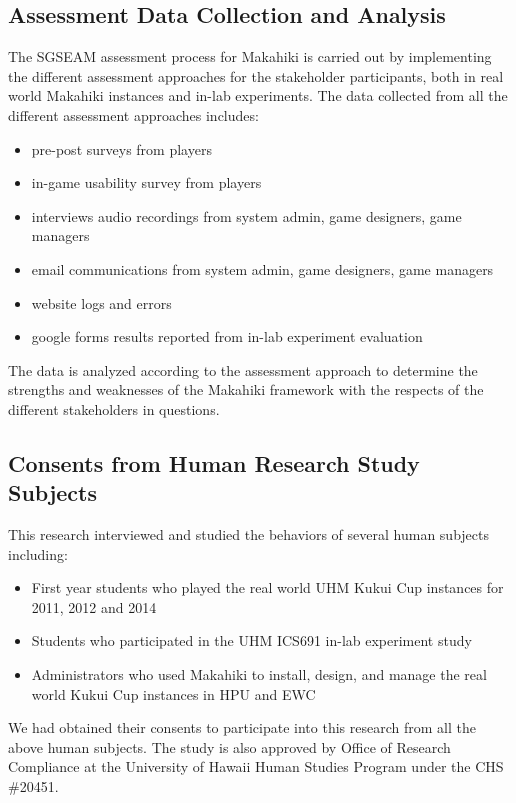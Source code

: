 \subsection{Assessment Data Collection and Analysis}

The SGSEAM assessment process for Makahiki is carried out by implementing the different assessment approaches for the stakeholder participants, both in real world Makahiki instances and in-lab experiments. The data collected from all the different assessment approaches includes:

\begin{itemize}
\item pre-post surveys from players
\item in-game usability survey from players
\item interviews audio recordings from system admin, game designers, game managers
\item email communications from system admin, game designers, game managers
\item website logs and errors
\item google forms results reported from in-lab experiment evaluation
\end{itemize}

The data is analyzed according to the assessment approach to determine the strengths and weaknesses of the Makahiki framework with the respects of the different stakeholders in questions.

\subsection{Consents from Human Research Study Subjects}
This research interviewed and studied the behaviors of several human subjects including:

\begin{itemize}
\item First year students who played the real world UHM Kukui Cup instances for 2011, 2012 and 2014
\item Students who participated in the UHM ICS691 in-lab experiment study
\item Administrators who used Makahiki to install, design, and manage the real world Kukui Cup instances in HPU and EWC
\end{itemize}

We had obtained their consents to participate into this research from all the above human subjects. The study is also approved by Office of Research Compliance at the University of Hawaii Human Studies Program under the CHS \#20451.
